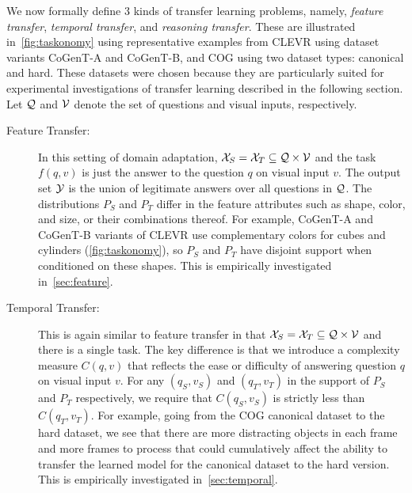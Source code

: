 We now formally define 3 kinds of transfer learning problems, namely,
\emph{feature transfer}, \emph{temporal transfer},
and \emph{reasoning transfer}.
These are illustrated in~\cref{fig:taskonomy} using representative examples from CLEVR using dataset variants CoGenT-A and CoGenT-B, and COG using two dataset types: canonical and hard. These datasets were chosen because they
are particularly suited for experimental investigations of transfer learning described in the following section.
Let $\mathcal{Q}$ and $\mathcal{V}$ denote the set of questions and visual inputs, respectively.
\begin{description}
	\item[Feature Transfer:] In this setting of domain adaptation, $\mathcal{X}_S = \mathcal{X}_T \subseteq \mathcal{Q} \times \mathcal{V}$
	and the task $f(q,v)$ is just the answer to the question $q$ on visual input $v$. The output set $\mathcal{Y}$ is the union of legitimate answers
	over all questions in $\mathcal{Q}$.
	The distributions $P_S$ and $P_T$ differ in the feature attributes such as shape, color, and size, or their combinations
	thereof.
	For example, CoGenT-A and CoGenT-B variants of CLEVR use complementary colors
	for cubes and cylinders (\cref{fig:taskonomy}), so $P_S$ and $P_T$ have disjoint support when conditioned on these shapes. This is empirically investigated in~\cref{sec:feature}.
		
	\item[Temporal Transfer:] This is again similar to feature transfer in that $\mathcal{X}_S = \mathcal{X}_T \subseteq \mathcal{Q} \times \mathcal{V}$
	and there is a single task.	The key difference is that we introduce a complexity measure $C(q,v)$ that reflects the ease or difficulty of answering question $q$ on visual input $v$. 
	For any $(q_S,v_S)$ and $(q_T,v_T)$ in the support of $P_S$ and $P_T$ respectively, we require that $C(q_S,v_S)$ is strictly less than $C(q_T,v_T)$.
	For example, going from the COG canonical dataset to the hard dataset, we see that there are more distracting objects in each frame and more frames to process that could cumulatively affect the ability to transfer the learned model for the canonical dataset to the hard version. This is empirically investigated in~\cref{sec:temporal}.	
	

\end{description}
